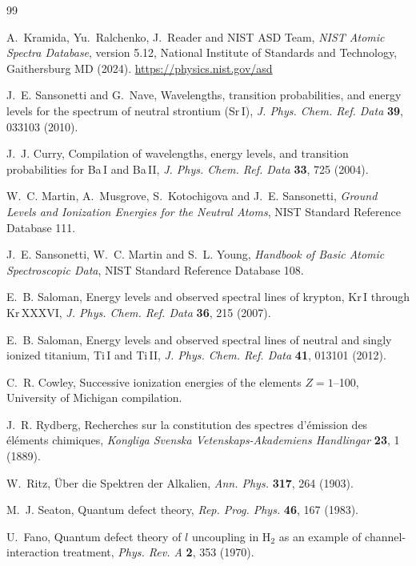 \documentclass[11pt,a4paper]{article}
\theoremstyle{definition}
\begin{document}
\begin{thebibliography}{99}
\small

 A.~Kramida, Yu.~Ralchenko, J.~Reader and NIST ASD Team,
\emph{NIST Atomic Spectra Database}, version 5.12, National Institute of
Standards and Technology, Gaithersburg MD (2024).
\url{https://physics.nist.gov/asd}

 J.~E. Sansonetti and G.~Nave, Wavelengths, transition
probabilities, and energy levels for the spectrum of neutral strontium (Sr\,I),
\emph{J. Phys. Chem. Ref. Data} \textbf{39}, 033103 (2010).

 J.~J. Curry, Compilation of wavelengths, energy levels, and
transition probabilities for Ba\,I and Ba\,II, \emph{J. Phys. Chem. Ref. Data}
\textbf{33}, 725 (2004).

 W.~C. Martin, A.~Musgrove, S.~Kotochigova and J.~E.
Sansonetti, \emph{Ground Levels and Ionization Energies for the Neutral Atoms},
NIST Standard Reference Database 111.

 J.~E. Sansonetti, W.~C. Martin and S.~L. Young,
\emph{Handbook of Basic Atomic Spectroscopic Data}, NIST Standard Reference
Database 108.

 E.~B. Saloman, Energy levels and observed spectral lines of
krypton, Kr\,I through Kr\,XXXVI, \emph{J. Phys. Chem. Ref. Data} \textbf{36},
215 (2007).

 E.~B. Saloman, Energy levels and observed spectral lines of
neutral and singly ionized titanium, Ti\,I and Ti\,II, \emph{J. Phys. Chem. Ref.
Data} \textbf{41}, 013101 (2012).

 C.~R. Cowley, Successive ionization energies of the elements
$Z=1$--100, University of Michigan compilation.

 J.~R. Rydberg, Recherches sur la constitution des spectres
d'\'emission des \'el\'ements chimiques, \emph{Kongliga Svenska
Vetenskaps-Akademiens Handlingar} \textbf{23}, 1 (1889).

 W.~Ritz, \"Uber die Spektren der Alkalien, \emph{Ann. Phys.}
\textbf{317}, 264 (1903).

 M.~J. Seaton, Quantum defect theory, \emph{Rep. Prog. Phys.}
\textbf{46}, 167 (1983).

 U.~Fano, Quantum defect theory of $l$ uncoupling in H$_2$ as an
example of channel-interaction treatment, \emph{Phys. Rev. A} \textbf{2}, 353
(1970).


\end{thebibliography}
\end{document}
